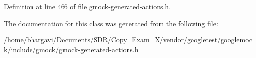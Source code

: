 Definition at line 466 of file gmock-\/generated-\/actions.\+h.



The documentation for this class was generated from the following file\+:\begin{DoxyCompactItemize}
\item 
/home/bhargavi/\+Documents/\+S\+D\+R/\+Copy\+\_\+\+Exam\+\_\+X/vendor/googletest/googlemock/include/gmock/\hyperlink{gmock-generated-actions_8h}{gmock-\/generated-\/actions.\+h}\end{DoxyCompactItemize}
